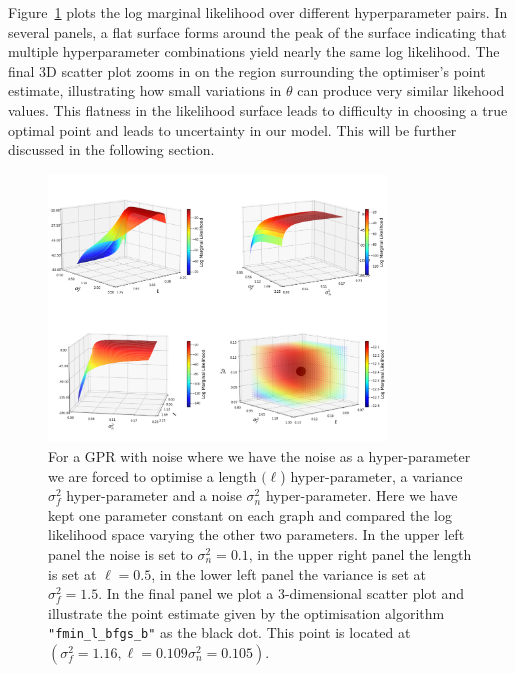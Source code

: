 \documentclass{ucdgradtaughtthesis}
\begin{document}
Figure~\ref{fig:Optimising_Hyperparams} plots the log marginal likelihood over different hyperparameter pairs. In several panels, a flat surface forms around the peak of the surface indicating that multiple hyperparameter combinations yield nearly the same log likelihood.
The final 3D scatter plot zooms in on the region surrounding the optimiser’s point estimate, illustrating how small variations in \(\theta\) can produce very similar likehood values. 
This flatness in the likelihood surface leads to difficulty in choosing a true optimal point and leads to uncertainty in our model. This will be further discussed in the following section.

\begin{figure}[H]
    \centering
    \includegraphics[width=0.8\textwidth]{LatexPlots/1dplots/LogLikeallparams.png}
    \caption[Visualising the log likelihood optimisation surfaces over the model parameters.]{For a GPR with noise where we have the noise as a hyper-parameter we are forced to optimise a length \((\ell\)) hyper-parameter, a variance \(\sigma_f^2\) hyper-parameter and a noise \(\sigma_n^2\) hyper-parameter. 
    Here we have kept one parameter constant on each graph and compared the log likelihood space varying the other two parameters. 
    In the upper left panel the noise is set to $\sigma^2_n= 0.1$, in the upper right panel the length is set at $ \ell=0.5$, in the lower left panel the variance is set at $\sigma^2_f=1.5$. 
    In the final panel we plot a 3-dimensional scatter plot and illustrate the point estimate given by the optimisation algorithm \texttt{"fmin\_l\_bfgs\_b"} as the black dot. This point is located at
    $(\sigma_f^2 = 1.16, \ell = 0.109 \sigma_n^2 = 0.105)$.}
   \label{fig:Optimising_Hyperparams}
\end{figure} 
\end{document}

